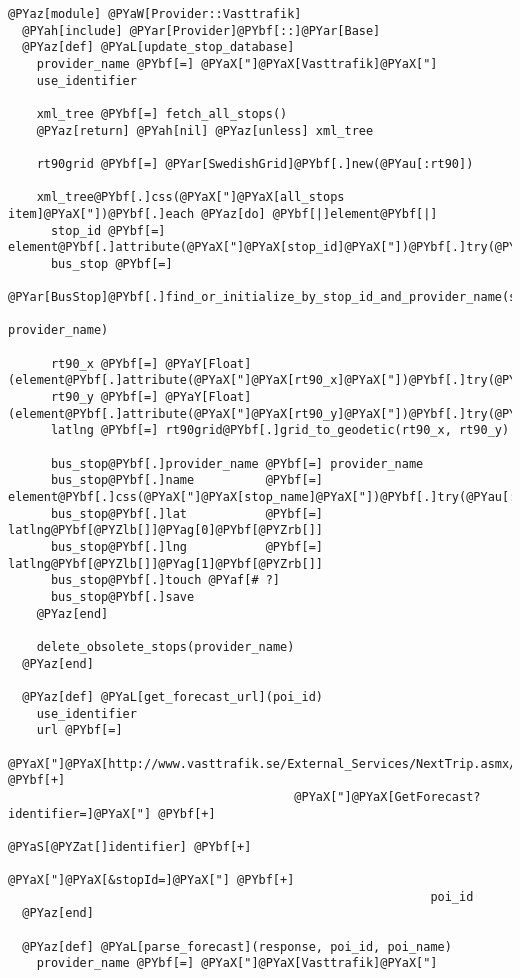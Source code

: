 \begin{Verbatim}[commandchars=@\[\]]
@PYaz[module] @PYaW[Provider::Vasttrafik]
  @PYah[include] @PYar[Provider]@PYbf[::]@PYar[Base]
  @PYaz[def] @PYaL[update_stop_database]
    provider_name @PYbf[=] @PYaX["]@PYaX[Vasttrafik]@PYaX["]
    use_identifier

    xml_tree @PYbf[=] fetch_all_stops()
    @PYaz[return] @PYah[nil] @PYaz[unless] xml_tree

    rt90grid @PYbf[=] @PYar[SwedishGrid]@PYbf[.]new(@PYau[:rt90])

    xml_tree@PYbf[.]css(@PYaX["]@PYaX[all_stops item]@PYaX["])@PYbf[.]each @PYaz[do] @PYbf[|]element@PYbf[|]
      stop_id @PYbf[=] element@PYbf[.]attribute(@PYaX["]@PYaX[stop_id]@PYaX["])@PYbf[.]try(@PYau[:text])@PYbf[.]to_s
      bus_stop @PYbf[=]
        @PYar[BusStop]@PYbf[.]find_or_initialize_by_stop_id_and_provider_name(stop_id,
                                                          provider_name)

      rt90_x @PYbf[=] @PYaY[Float](element@PYbf[.]attribute(@PYaX["]@PYaX[rt90_x]@PYaX["])@PYbf[.]try(@PYau[:text])@PYbf[.]to_s)
      rt90_y @PYbf[=] @PYaY[Float](element@PYbf[.]attribute(@PYaX["]@PYaX[rt90_y]@PYaX["])@PYbf[.]try(@PYau[:text])@PYbf[.]to_s)
      latlng @PYbf[=] rt90grid@PYbf[.]grid_to_geodetic(rt90_x, rt90_y)

      bus_stop@PYbf[.]provider_name @PYbf[=] provider_name
      bus_stop@PYbf[.]name          @PYbf[=] element@PYbf[.]css(@PYaX["]@PYaX[stop_name]@PYaX["])@PYbf[.]try(@PYau[:text])@PYbf[.]to_s
      bus_stop@PYbf[.]lat           @PYbf[=] latlng@PYbf[@PYZlb[]]@PYag[0]@PYbf[@PYZrb[]]
      bus_stop@PYbf[.]lng           @PYbf[=] latlng@PYbf[@PYZlb[]]@PYag[1]@PYbf[@PYZrb[]]
      bus_stop@PYbf[.]touch @PYaf[# ?]
      bus_stop@PYbf[.]save
    @PYaz[end]

    delete_obsolete_stops(provider_name)
  @PYaz[end]

  @PYaz[def] @PYaL[get_forecast_url](poi_id)
    use_identifier
    url @PYbf[=]
      @PYaX["]@PYaX[http://www.vasttrafik.se/External_Services/NextTrip.asmx/]@PYaX["] @PYbf[+] 
                                        @PYaX["]@PYaX[GetForecast?identifier=]@PYaX["] @PYbf[+]
                                                      @PYaS[@PYZat[]identifier] @PYbf[+]
                                                       @PYaX["]@PYaX[&stopId=]@PYaX["] @PYbf[+]
                                                           poi_id
  @PYaz[end]
  
  @PYaz[def] @PYaL[parse_forecast](response, poi_id, poi_name)
    provider_name @PYbf[=] @PYaX["]@PYaX[Vasttrafik]@PYaX["]


\end{Verbatim}
